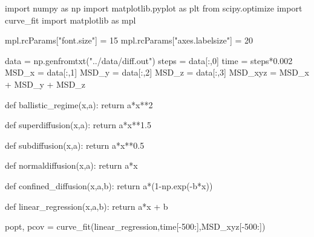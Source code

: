 \documentclass[
  letterpaper,
]{article}
\newenvironment{Shaded}{\begin{snugshade}}{\end{snugshade}}
\newcommand{\ControlFlowTok}[1]{\textcolor[rgb]{0.00,0.23,0.31}{#1}}
\newcommand{\DecValTok}[1]{\textcolor[rgb]{0.68,0.00,0.00}{#1}}
\newcommand{\FloatTok}[1]{\textcolor[rgb]{0.68,0.00,0.00}{#1}}
\newcommand{\ImportTok}[1]{\textcolor[rgb]{0.00,0.46,0.62}{#1}}
\newcommand{\KeywordTok}[1]{\textcolor[rgb]{0.00,0.23,0.31}{#1}}
\newcommand{\NormalTok}[1]{\textcolor[rgb]{0.00,0.23,0.31}{#1}}
\newcommand{\OperatorTok}[1]{\textcolor[rgb]{0.37,0.37,0.37}{#1}}
\newcommand{\StringTok}[1]{\textcolor[rgb]{0.13,0.47,0.30}{#1}}
\begin{document}
\begin{Shaded}
\begin{Highlighting}[]
\ImportTok{import}\NormalTok{ numpy }\ImportTok{as}\NormalTok{ np}
\ImportTok{import}\NormalTok{ matplotlib.pyplot }\ImportTok{as}\NormalTok{ plt}
\ImportTok{from}\NormalTok{ scipy.optimize }\ImportTok{import}\NormalTok{ curve\_fit}
\ImportTok{import}\NormalTok{ matplotlib }\ImportTok{as}\NormalTok{ mpl}

\NormalTok{mpl.rcParams[}\StringTok{"font.size"}\NormalTok{] }\OperatorTok{=} \DecValTok{15}
\NormalTok{mpl.rcParams[}\StringTok{"axes.labelsize"}\NormalTok{] }\OperatorTok{=} \DecValTok{20}

\NormalTok{data }\OperatorTok{=}\NormalTok{ np.genfromtxt(}\StringTok{"../data/diff.out"}\NormalTok{)}
\NormalTok{steps }\OperatorTok{=}\NormalTok{ data[:,}\DecValTok{0}\NormalTok{]}
\NormalTok{time }\OperatorTok{=}\NormalTok{ steps}\OperatorTok{*}\FloatTok{0.002}
\NormalTok{MSD\_x }\OperatorTok{=}\NormalTok{ data[:,}\DecValTok{1}\NormalTok{]}
\NormalTok{MSD\_y }\OperatorTok{=}\NormalTok{ data[:,}\DecValTok{2}\NormalTok{]}
\NormalTok{MSD\_z }\OperatorTok{=}\NormalTok{ data[:,}\DecValTok{3}\NormalTok{]}
\NormalTok{MSD\_xyz }\OperatorTok{=}\NormalTok{ MSD\_x }\OperatorTok{+}\NormalTok{ MSD\_y }\OperatorTok{+}\NormalTok{ MSD\_z}

\KeywordTok{def}\NormalTok{ ballistic\_regime(x,a):}
  \ControlFlowTok{return}\NormalTok{ a}\OperatorTok{*}\NormalTok{x}\OperatorTok{**}\DecValTok{2}

\KeywordTok{def}\NormalTok{ superdiffusion(x,a):}
  \ControlFlowTok{return}\NormalTok{ a}\OperatorTok{*}\NormalTok{x}\OperatorTok{**}\FloatTok{1.5}

\KeywordTok{def}\NormalTok{ subdiffusion(x,a):}
  \ControlFlowTok{return}\NormalTok{ a}\OperatorTok{*}\NormalTok{x}\OperatorTok{**}\FloatTok{0.5}

\KeywordTok{def}\NormalTok{ normaldiffusion(x,a):}
  \ControlFlowTok{return}\NormalTok{ a}\OperatorTok{*}\NormalTok{x}

\KeywordTok{def}\NormalTok{ confined\_diffusion(x,a,b):}
  \ControlFlowTok{return}\NormalTok{ a}\OperatorTok{*}\NormalTok{(}\DecValTok{1}\OperatorTok{{-}}\NormalTok{np.exp(}\OperatorTok{{-}}\NormalTok{b}\OperatorTok{*}\NormalTok{x))}

\KeywordTok{def}\NormalTok{ linear\_regression(x,a,b):}
  \ControlFlowTok{return}\NormalTok{ a}\OperatorTok{*}\NormalTok{x }\OperatorTok{+}\NormalTok{ b}

\NormalTok{popt, pcov }\OperatorTok{=}\NormalTok{ curve\_fit(linear\_regression,time[}\OperatorTok{{-}}\DecValTok{500}\NormalTok{:],MSD\_xyz[}\OperatorTok{{-}}\DecValTok{500}\NormalTok{:])}


\end{Highlighting}
\end{Shaded}
\end{document}
